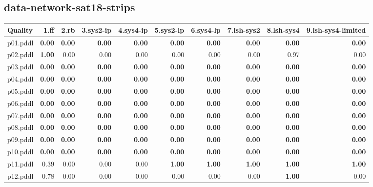 \documentclass{article}
\begin{document}
\hypertarget{quality-data-network-sat18-strips}{}
\subsection*{data-network-sat18-strips}

\begin{tabular}{@{}lrrrrrrrrr@{}}
Quality & 1.ff & 2.rb & 3.sys2-ip & 4.sys4-ip & 5.sys2-lp & 6.sys4-lp & 7.lsh-sys2 & 8.lsh-sys4 & 9.lsh-sys4-limited \\
\midrule
p01.pddl & \textbf{0.00} & \textbf{0.00} & \textbf{0.00} & \textbf{0.00} & \textbf{0.00} & \textbf{0.00} & \textbf{0.00} & \textbf{0.00} & \textbf{0.00} \\
p02.pddl & \textbf{1.00} & 0.00 & 0.00 & 0.00 & 0.00 & 0.00 & 0.00 & 0.97 & 0.00 \\
p03.pddl & \textbf{0.00} & \textbf{0.00} & \textbf{0.00} & \textbf{0.00} & \textbf{0.00} & \textbf{0.00} & \textbf{0.00} & \textbf{0.00} & \textbf{0.00} \\
p04.pddl & \textbf{0.00} & \textbf{0.00} & \textbf{0.00} & \textbf{0.00} & \textbf{0.00} & \textbf{0.00} & \textbf{0.00} & \textbf{0.00} & \textbf{0.00} \\
p05.pddl & \textbf{0.00} & \textbf{0.00} & \textbf{0.00} & \textbf{0.00} & \textbf{0.00} & \textbf{0.00} & \textbf{0.00} & \textbf{0.00} & \textbf{0.00} \\
p06.pddl & \textbf{0.00} & \textbf{0.00} & \textbf{0.00} & \textbf{0.00} & \textbf{0.00} & \textbf{0.00} & \textbf{0.00} & \textbf{0.00} & \textbf{0.00} \\
p07.pddl & \textbf{0.00} & \textbf{0.00} & \textbf{0.00} & \textbf{0.00} & \textbf{0.00} & \textbf{0.00} & \textbf{0.00} & \textbf{0.00} & \textbf{0.00} \\
p08.pddl & \textbf{0.00} & \textbf{0.00} & \textbf{0.00} & \textbf{0.00} & \textbf{0.00} & \textbf{0.00} & \textbf{0.00} & \textbf{0.00} & \textbf{0.00} \\
p09.pddl & \textbf{0.00} & \textbf{0.00} & \textbf{0.00} & \textbf{0.00} & \textbf{0.00} & \textbf{0.00} & \textbf{0.00} & \textbf{0.00} & \textbf{0.00} \\
p10.pddl & \textbf{0.00} & \textbf{0.00} & \textbf{0.00} & \textbf{0.00} & \textbf{0.00} & \textbf{0.00} & \textbf{0.00} & \textbf{0.00} & \textbf{0.00} \\
p11.pddl & 0.39 & 0.00 & 0.00 & 0.00 & \textbf{1.00} & \textbf{1.00} & \textbf{1.00} & \textbf{1.00} & \textbf{1.00} \\
p12.pddl & 0.78 & 0.00 & 0.00 & 0.00 & 0.00 & 0.00 & 0.00 & \textbf{1.00} & 0.00 \\

\end{tabular}
\end{document}
